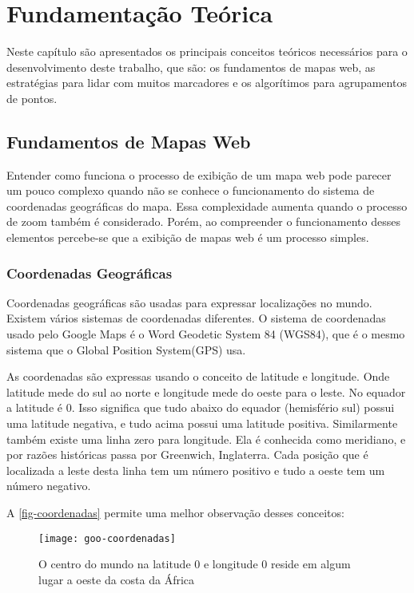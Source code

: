 \chapter{Fundamentação Teórica}

Neste capítulo são apresentados os principais conceitos teóricos necessários para o desenvolvimento deste trabalho, que são: os fundamentos de mapas web, as estratégias para lidar com muitos marcadores e os algorítimos para agrupamentos de pontos.

\section{Fundamentos de Mapas Web}
	Entender como funciona o processo de exibição de um mapa web pode parecer um pouco complexo quando não se conhece o funcionamento do sistema de coordenadas geográficas do mapa. Essa complexidade aumenta quando o processo de zoom também é considerado. Porém, ao compreender o funcionamento desses elementos percebe-se que a exibição de mapas web é um processo simples.
	
	\subsection{Coordenadas Geográficas}
	Coordenadas geográficas são usadas para expressar localizações no mundo. Existem vários sistemas de coordenadas diferentes. O sistema de coordenadas usado pelo Google Maps é o Word Geodetic System 84 (WGS84), que é o mesmo sistema que o Global Position System(GPS) usa.
	
	As coordenadas são expressas usando o conceito de latitude e longitude. Onde latitude mede do sul ao norte e longitude mede do oeste para o leste. No equador a latitude é 0. Isso significa que tudo abaixo do equador (hemisfério sul) possui uma latitude negativa, e tudo acima possui uma latitude positiva. Similarmente também existe uma linha zero para longitude. Ela é conhecida como meridiano, e por razões históricas passa por Greenwich, Inglaterra. Cada posição que é localizada a leste desta linha tem um número positivo e tudo a oeste tem um número negativo\cite[4]{livroGoogleApiV3}. 
	
	A \autoref{fig-coordenadas} permite uma melhor observação desses conceitos:
	\begin{figure}[htb]
	\caption{\label{fig-coordenadas} O centro do mundo na latitude 0 e longitude 0 reside em algum lugar a oeste da costa da África}
	\begin{center}
	    \texttt{[image: goo-coordenadas]}
	\end{center}
	\end{figure}
	
